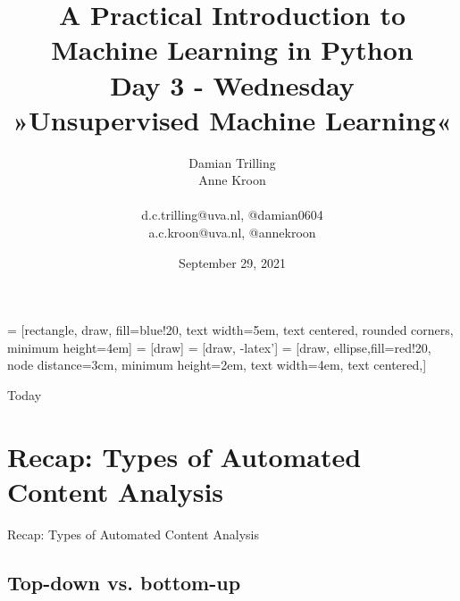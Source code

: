 \documentclass[compress]{beamer}
\begin{document}
\title[Big Data and Automated Content Analysis]{\textbf{A Practical Introduction to Machine Learning in Python} \\Day 3 - Wednesday \\ »Unsupervised Machine Learning«}
\author[Damian Trilling, Anne Kroon]{Damian Trilling \\ Anne Kroon \\ ~ \\ \footnotesize{d.c.trilling@uva.nl, @damian0604 \\a.c.kroon@uva.nl, @annekroon} \\}
\date{September 29, 2021}


 = [rectangle, draw, fill=blue!20, 
text width=5em, text centered, rounded corners, minimum height=4em]
 = [draw]
 = [draw, -latex']
 = [draw, ellipse,fill=red!20, node distance=3cm,
minimum height=2em, text width=4em, text centered,]




\begin{frame}{}
\titlepage
\end{frame}

\begin{frame}{Today}
\tableofcontents
\end{frame}




\section[Recap]{Recap: Types of Automated Content Analysis}
\begin{frame}{}
Recap: Types of Automated Content Analysis
\end{frame}
\subsection*{Top-down vs. bottom-up}


\begin{frame}[plain]
\end{frame}
\end{document}
